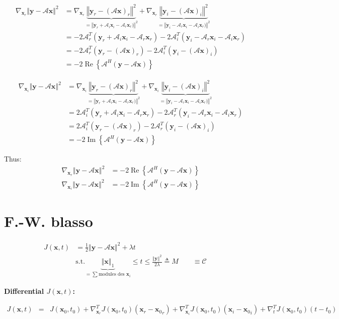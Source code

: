 \documentclass{article}
\renewcommand{\vec}[1]{\ensuremath{\bm{#1}}}
\newcommand{\y}{\vec{y}}
\newcommand{\dico}{\ensuremath{\mathcal{A}}}
\newcommand{\x}{\vec{x}}
\newcommand{\norm}[1]{\ensuremath{\left\Vert#1\right\Vert}}
\newcommand{\normUn}[1]{\ensuremath{\left\Vert#1\right\Vert_1}}
\renewcommand{\Re}{\operatorname{Re}}
\renewcommand{\Im}{\operatorname{Im}}
\begin{document}
	\begin{align*}
		\nabla_{\x_r}\norm{\y-\dico\x}^2 & = \nabla_{\x_r}\underbrace{\norm{\y_r-(\dico\x)_r}^2}_{=\norm{\y_r+\dico_i\x_i-\dico_r\x_r)}^2} +\nabla_{\x_r}\underbrace{\norm{\y_i-(\dico\x)_i}^2}_{=\norm{\y_i-\dico_r\x_i-\dico_i\x_r)}^2}\\
		& = -2\dico^T_r(\y_r+\dico_i\x_i-\dico_r\x_r)-2\dico^T_i(\y_i-\dico_r\x_i-\dico_i\x_r)\\
		& = -2\dico^T_r(\y_r-(\dico\x)_r)-2\dico^T_i(\y_i-(\dico\x)_i)\\
		& = -2\Re\left\{\dico^H(\y-\dico\x)\right\}
	\end{align*}
	
	\begin{align*}
	\nabla_{\x_i}\norm{\y-\dico\x}^2 & = \nabla_{\x_i}\underbrace{\norm{\y_r-(\dico\x)_r}^2}_{=\norm{\y_r+\dico_i\x_i-\dico_r\x_r)}^2} +\nabla_{\x_i}\underbrace{\norm{\y_i-(\dico\x)_i}^2}_{=\norm{\y_i-\dico_r\x_i-\dico_i\x_r)}^2}\\
	& = 2\dico^T_i(\y_r+\dico_i\x_i-\dico_r\x_r)-2\dico^T_r(\y_i-\dico_r\x_i-\dico_i\x_r)\\
	& = 2\dico^T_i(\y_r-(\dico\x)_r)-2\dico^T_r(\y_i-(\dico\x)_i)\\
	& = -2\Im\left\{\dico^H(\y-\dico\x)\right\}
	\end{align*}
	
	Thus:
	\begin{align}
		\nabla_{\x_r}\norm{\y-\dico\x}^2 & = -2\Re\left\{\dico^H(\y-\dico\x)\right\}\label{diffXr}\\
		\nabla_{\x_i}\norm{\y-\dico\x}^2 & = -2\Im\left\{\dico^H(\y-\dico\x)\right\}\label{diffXi}
	\end{align}
	
	
	\newpage
	\section*{F.-W. blasso}
	
	\begin{align*}
		J(\x,t) & = \frac{1}{2}\norm{\y-\dico\x}^2+\lambda t&&\\
		& \text{s.t.} \underbrace{\normUn{\x}}_{=\sum \text{modules des }\x_i}\leq t\leq \frac{\norm{\y}^2}{2\lambda}\triangleq M \qquad\equiv \mathcal{C}&& 
	\end{align*}
	
	\textbf{Differential $J(\x,t)$:}
	
	\begin{eqnarray*}
		J(\x,t) & = & J(\x_0,t_0)
		+\nabla_{\x_r}^TJ(\x_0,t_0)(\x_r-{\x_0}_r)
		+\nabla_{\x_i}^TJ(\x_0,t_0)(\x_i-{\x_0}_i)
		+\nabla_{t}^TJ(\x_0,t_0)(t-t_0)
	\end{eqnarray*}
	
\end{document}

